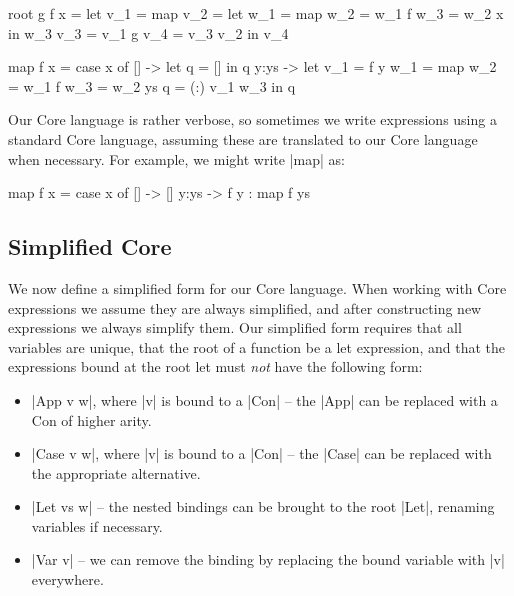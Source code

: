 \documentclass[draft]{sigplanconf}
\begin{document}
\begin{code}
root g f x =  let  v_1 =  map
                   v_2 =  let  w_1 = map
                               w_2 = w_1 f
                               w_3 = w_2 x
                          in   w_3
                   v_3 =  v_1 g
                   v_4 =  v_3 v_2
              in   v_4

map f x = case  x of
                []    ->   let  q    = []
                           in   q
                y:ys  ->   let  v_1  = f y
                                w_1  = map
                                w_2  = w_1 f
                                w_3  = w_2 ys
                                q    = (:) v_1 w_3
                           in   q
\end{code}

Our Core language is rather verbose, so sometimes we write expressions using a standard Core language, assuming these are translated to our Core language when necessary. For example, we might write |map| as:

\begin{code}
map f x = case  x of
                []    -> []
                y:ys  -> f y : map f ys
\end{code}

\subsection{Simplified Core}
\label{sec:simplify}

We now define a simplified form for our Core language. When working with Core expressions we assume they are always simplified, and after constructing new expressions we always simplify them. Our simplified form requires that all variables are unique, that the root of a function be a let expression, and that the expressions bound at the root let must \textit{not} have the following form:

\begin{itemize}
\item |App v w|, where |v| is bound to a |Con| -- the |App| can be replaced with a Con of higher arity.
\item |Case v w|, where |v| is bound to a |Con| -- the |Case| can be replaced with the appropriate alternative.
\item |Let vs w| -- the nested bindings can be brought to the root |Let|, renaming variables if necessary.
\item |Var v| -- we can remove the binding by replacing the bound variable with |v| everywhere.
\end{itemize}
\end{document}
